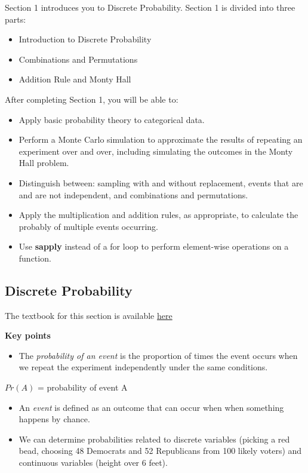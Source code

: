 \documentclass[
]{article}
\providecommand{\tightlist}{%
  \setlength{\itemsep}{0pt}\setlength{\parskip}{0pt}}
\begin{document}
Section 1 introduces you to Discrete Probability. Section 1 is divided
into three parts:

\begin{itemize}
\tightlist
\item
  Introduction to Discrete Probability
\item
  Combinations and Permutations
\item
  Addition Rule and Monty Hall
\end{itemize}

After completing Section 1, you will be able to:

\begin{itemize}
\tightlist
\item
  Apply basic probability theory to categorical data.
\item
  Perform a Monte Carlo simulation to approximate the results of
  repeating an experiment over and over, including simulating the
  outcomes in the Monty Hall problem.
\item
  Distinguish between: sampling with and without replacement, events
  that are and are not independent, and combinations and permutations.
\item
  Apply the multiplication and addition rules, as appropriate, to
  calculate the probably of multiple events occurring.
\item
  Use \textbf{sapply} instead of a for loop to perform element-wise
  operations on a function.
\end{itemize}

\hypertarget{discrete-probability}{%
\subsection{Discrete Probability}\label{discrete-probability}}

The textbook for this section is available
\href{https://rafalab.github.io/dsbook/probability.html\#discrete-probability}{here}

\textbf{Key points}

\begin{itemize}
\tightlist
\item
  The \emph{probability of an event} is the proportion of times the
  event occurs when we repeat the experiment independently under the
  same conditions.
\end{itemize}

\(Pr(A)\) = probability of event A

\begin{itemize}
\tightlist
\item
  An \emph{event} is defined as an outcome that can occur when when
  something happens by chance.
\item
  We can determine probabilities related to discrete variables (picking
  a red bead, choosing 48 Democrats and 52 Republicans from 100 likely
  voters) and continuous variables (height over 6 feet).
\end{itemize}
\end{document}
